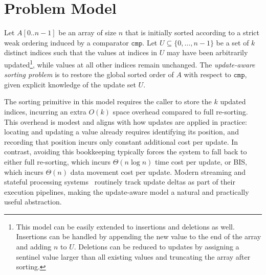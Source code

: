 \section{Problem Model}
\label{sec:model}

\begin{definition}
\label{def:problem}

Let $A[0..n-1]$ be an array of size $n$ that is initially sorted according to a strict weak ordering induced by a comparator $\texttt{cmp}$. Let $U \subseteq \{0,\dots,n-1\}$ be a set of $k$ distinct indices such that the values at indices in $U$ may have been arbitrarily updated\footnote{This model can be easily extended to insertions and deletions as well. Insertions can be handled by appending the new value to the end of the array and adding $n$ to $U$. Deletions can be reduced to updates by assigning a sentinel value larger than all existing values and truncating the array after sorting.}, while values at all other indices remain unchanged. The \emph{update-aware sorting problem} is to restore the global sorted order of $A$ with respect to $\texttt{cmp}$, given explicit knowledge of the update set $U$.
\end{definition}

The sorting primitive in this model requires the caller to store the $k$ updated indices, incurring an extra $O(k)$ space overhead compared to full re-sorting. This overhead is modest and aligns with how updates are applied in practice: locating and updating a value already requires identifying its position, and recording that position incurs only constant additional cost per update. In contrast, avoiding this bookkeeping typically forces the system to fall back to either full re-sorting, which incurs $\Theta(n \log n)$ time cost per update, or BIS, which incurs $\Theta(n)$ data movement cost per update. Modern streaming and stateful processing systems~\cite{kleppmann2017ddia} routinely track update deltas as part of their execution pipelines, making the update-aware model a natural and practically useful abstraction.